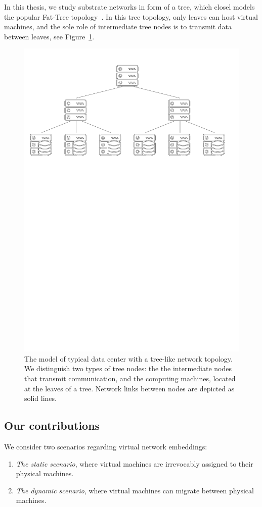 In this thesis, we study substrate networks in form of a tree, which closel models the popular Fat-Tree topology~\cite{fat-trees}.
In this tree topology, only leaves can host virtual machines, and the sole role of intermediate tree nodes is to transmit data between leaves, see Figure~\ref{fig:tree-topology}.


\begin{figure}[t]
\centering
\includegraphics[width=0.79\columnwidth]{figs/tree-topology.pdf}
\caption{The model of typical data center with a tree-like network topology. We distinguish two types of tree nodes: the the intermediate nodes that transmit communication, and the computing machines, located at the leaves of a tree. Network links between nodes are depicted as solid lines.}\label{fig:tree-topology}
\vspace{-1em}
\end{figure}


\subsection{Our contributions}

We consider two scenarios regarding virtual network embeddings:
\begin{enumerate}
  \item \emph{The static scenario}, where virtual machines are irrevocably assigned to their physical machines.
  \item \emph{The dynamic scenario}, where virtual machines can migrate between physical machines.
\end{enumerate}

